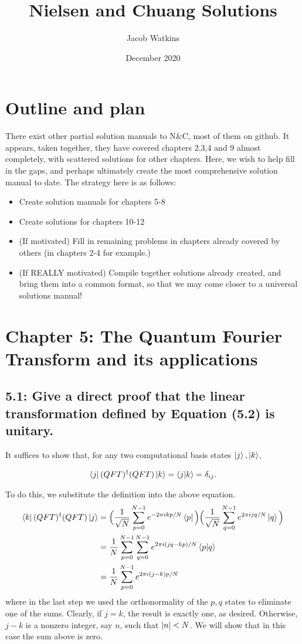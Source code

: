 \documentclass{article}
\title{Nielsen and Chuang Solutions}
\author{Jacob Watkins}
\date{December 2020}
\begin{document}
\maketitle
\section{Outline and plan}
There exist other partial solution manuals to N\&C, most of them on github. It appears, taken together, they have covered chapters 2,3,4 and 9 almost completely, with scattered solutions for other chapters. Here, we wish to help fill in the gaps, and perhaps ultimately create the most comprehensive solution manual to date. The strategy here is as follows:
\begin{itemize}
    \item Create solution manuals for chapters 5-8
    \item Create solutions for chapters 10-12
    \item (If motivated) Fill in remaining problems in chapters already covered by others (in chapters 2-4 for example.)
    \item (If REALLY motivated) Compile together solutions already created, and bring them into a common format, so that we may come closer to a universal solutions manual!
\end{itemize}

\section*{Chapter 5: The Quantum Fourier Transform and its applications}

\subsection*{5.1: Give a direct proof that the linear transformation defined by Equation (5.2) is unitary.}
It suffices to show that, for any two computational basis states $\ket{j}, \ket{k}$,

\begin{align} \label{eq:5.1:QFT_unitary}
    \bra{j}(QFT)^\dagger(QFT)\ket{k} = \braket{j}{k} = \delta_{ij}.
\end{align}

To do this, we substitute the definition into the above equation. 
\begin{align} \label{eq:5.1:expand_and_simplify}
\begin{aligned}
    \bra{k}(QFT)^\dagger(QFT)\ket{j} &= \Big(\frac{1}{\sqrt{N}}\sum_{p=0}^{N-1}e^{-2\pi ikp/N}\bra{p}\Big)\Big(\frac{1}{\sqrt{N}}\sum_{q=0}^{N-1}e^{2\pi ijq/N}\ket{q}\Big) \\
    &= \frac{1}{N}\sum_{p=0}^{N-1}\sum_{q=0}^{N-1}e^{2\pi i(jq-kp)/N}\braket{p}{q} \\
    &= \frac{1}{N}\sum_{p=0}^{N-1} e^{2\pi i (j-k)p/N}
\end{aligned}
\end{align}
where in the last step we used the orthonormality of the $p,q$ states to eliminate one of the sums. Clearly, if $j=k$, the result is exactly one, as desired. Otherwise, $j-k$ is a nonzero integer, say $n$, such that $\abs{n}<N$. We will show that in this case the sum above is zero. 
\end{document}

